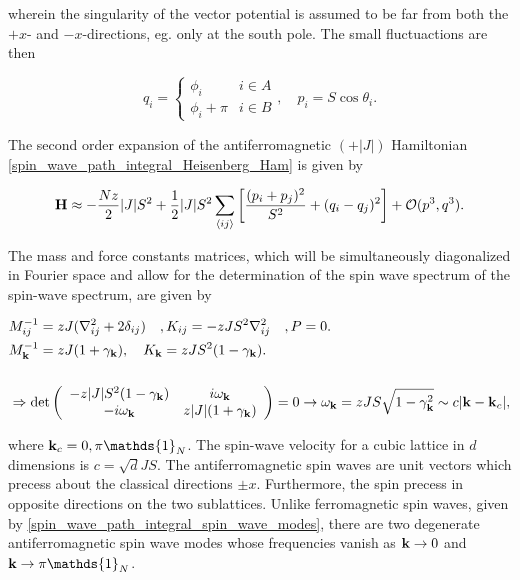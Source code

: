 wherein the singularity of the vector potential is assumed to be far from both 
the $+x$- and $-x$-directions, eg. only at the south pole. The small fluctuactions are then 

\begin{equation}
    q_i = \left\{ \begin{array}{cc}
         \phi_i & i \in A\\
         \phi_i + \pi & i \in B
    \end{array} \right., \quad p_i = S \cos \theta_i. 
\end{equation}

The second order expansion of the antiferromagnetic $(+ |J|)$ Hamiltonian \cref{spin_wave_path_integral_Heisenberg_Ham} is given by 

\begin{equation}
    {\bf H} \approx - \frac{Nz}{2} |J| S^2 + \frac{1}{2} |J| S^2 \sum_{ \langle ij \rangle } \bigg[ \frac{(p_i + p_j)^2}{S^2} + (q_i - q_j)^2\bigg] + \mathcal{O}(p^3, q^3).
\end{equation}

The mass and force constants matrices, which will be simultaneously diagonalized in Fourier space and allow for the determination of the spin wave spectrum of the spin-wave spectrum, are given by 

\begin{equation}
\begin{split}
    &M_{ij}^{-1} = z J (\nabla^2_{ij} + 2\delta_{ij}) \quad,  K_{ij} = -z J S^2 \nabla^2_{ij} \quad, P = 0. \\
    &M_{{\bf k}}^{-1} = zJ (1 + \gamma_{{\bf k}}), \quad K_{{\bf k}} = z J S^2 (1- \gamma_{{\bf k}}). \\
    \\
    &\Rightarrow \det \left(\begin{array}{cc}
        -z |J| S^2 (1- \gamma_{{\bf k}}) & i\omega_{{\bf k}}  \\
        -i \omega_{{\bf k}} & z |J| (1 + \gamma_{{\bf k}}) 
    \end{array}\right) = 0 \rightarrow \omega_{{\bf k}} = z J S \sqrt{1-\gamma_{{\bf k}}^2} \sim c |{\bf k} - {\bf k}_c|, 
    \label{spin_wave_pre_HP_naive_freq_antiferromagnet}
\end{split}
\end{equation} 

where ${\bf k}_c = 0, \pi \mathds{1}_{N}$. The spin-wave velocity for a cubic lattice in $d$ dimensions is $c = \sqrt{d} JS$. The antiferromagnetic spin waves are unit vectors which precess about the classical directions $\pm x$. Furthermore, the spin precess in opposite directions on the two sublattices. Unlike ferromagnetic spin waves, given by \cref{spin_wave_path_integral_spin_wave_modes}, there are two degenerate antiferromagnetic spin wave modes whose frequencies vanish as ${\bf k} \rightarrow 0$ and ${\bf k} \rightarrow \pi \mathds{1}_N$. \\

